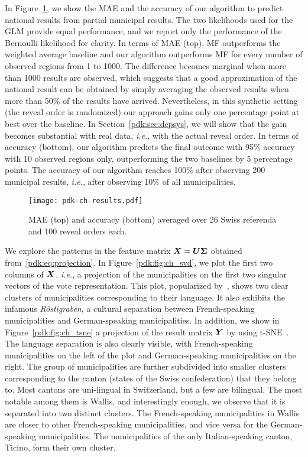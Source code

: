 In Figure~\ref{pdk:fig:ch_results}, we show the MAE and the accuracy of our algorithm to predict national results from partial municipal results.
The two likelihoods used for the GLM provide equal performance, and we report only the performance of the Bernoulli likelihood for clarity.
In terms of MAE (top), MF outperforms the weighted average baseline and our algorithm outperforms MF for every number of observed regions from 1 to 1000.
The difference becomes marginal when more than 1000 results are observed, which suggests that a good approximation of the national result can be obtained by simply averaging the observed results when more than 50\% of the results have arrived.
Nevertheless, in this synthetic setting (the reveal order is randomized) our approach gains only one percentage point at best over the baseline.
In Section~\ref{pdk:sec:depsys}, we will show that the gain becomes substantial with real data, \textit{i.e.}, with the actual reveal order.
In terms of accuracy (bottom), our algorithm predicts the final outcome with 95\% accuracy with 10 observed regions only, outperforming the two baselines by 5 percentage points.
The accuracy of our algorithm reaches 100\% after observing 200 municipal results, \textit{i.e.}, after observing 10\% of all municipalities.

\begin{figure}
	\centering
	\texttt{[image: pdk-ch-results.pdf]}
	\caption{MAE (top) and accuracy (bottom) averaged over 26 Swiss referenda and 100 reveal orders each.}
	\label{pdk:fig:ch_results}
\end{figure}

We explore the patterns in the feature matrix $\mbox{$\mbox{$\boldsymbol{X}$}$} = \mbox{$\mbox{$\boldsymbol{U}$}$} \mbox{$\mbox{$\boldsymbol{\Sigma}$}$}$ obtained from~\eqref{pdk:eq:projection}.
In Figure~\ref{pdk:fig:ch_svd}, we plot the first two columns of $\mbox{$\mbox{$\boldsymbol{X}$}$}$, \textit{i.e.}, a projection of the municipalities on the first two singular vectors of the vote representation.
This plot, popularized by~\citet{etter2014mining}, shows two clear clusters of municipalities corresponding to their language.
It also exhibits the infamous \textit{Röstigraben}, a cultural separation between French-speaking municipalities and German-speaking municipalities.
In addition, we show in Figure~\ref{pdk:fig:ch_tsne} a projection of the result matrix $\mbox{$\mbox{$\boldsymbol{Y}$}$}$ by using t-SNE~\citep{maaten2008visualizing}.
The language separation is also clearly visible, with French-speaking municipalities on the left of the plot and German-speaking municipalities on the right.
The group of municipalities are further subdivided into smaller clusters corresponding to the canton (states of the Swiss confederation) that they belong to.
Most cantons are uni-lingual in Switzerland, but a few are bilingual.
The most notable among them is Wallis, and interestingly enough, we observe that it is separated into two distinct clusters.
The French-speaking municipalities in Wallis are closer to other French-speaking municipalities, and vice versa for the German-speaking municipalities.
The municipalities of the only Italian-speaking canton, Ticino, form their own cluster.

